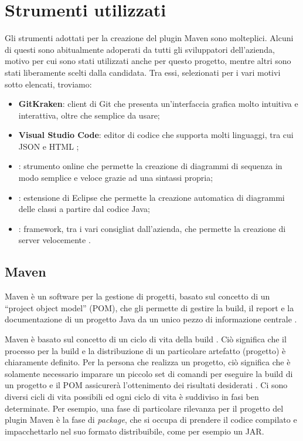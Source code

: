 
\section{Strumenti utilizzati}
Gli strumenti adottati per la creazione del plugin Maven sono molteplici.
Alcuni di questi sono abitualmente adoperati da tutti gli sviluppatori dell'azienda, motivo per cui sono stati utilizzati anche per questo progetto, mentre altri sono stati liberamente scelti dalla candidata.
Tra essi, selezionati per i vari motivi sotto elencati, troviamo:
\begin{itemize}
    \item \textbf{GitKraken}: client di Git che presenta un'interfaccia grafica molto intuitiva e interattiva, oltre che semplice da usare;
    \item \textbf{Visual Studio Code}: editor di codice che supporta molti linguaggi, tra cui JSON e HTML \cite{site:visual-studio-code};
    \item {}: strumento online che permette la creazione di diagrammi di sequenza in modo semplice e veloce grazie ad una sintassi propria;
    \item {}: estensione di Eclipse che permette la creazione automatica di diagrammi delle classi a partire dal codice Java;
    \item {}: framework, tra i vari consigliat dall'azienda, che permette la creazione di server velocemente \cite{site:meecrowave}.
\end{itemize}

    \subsection{Maven} \label{mavenSection} %
        
    Maven è un software per la gestione di progetti, basato sul concetto di un ``project object model'' (POM), che gli permette di gestire la build, il report e la documentazione di un progetto Java da un unico pezzo di informazione centrale \cite{site:maven-introduzione}.

    Maven è basato sul concetto di un ciclo di vita della build .
    Ciò significa che il processo per la build e la distribuzione di un particolare artefatto (progetto) è chiaramente definito. 
    Per la persona che realizza un progetto, ciò significa che è solamente necessario imparare un piccolo set di comandi per eseguire la build di un progetto e il POM assicurerà l'ottenimento dei risultati desiderati \cite{site:maven-lifecycle}.
    Ci sono diversi cicli di vita possibili ed ogni ciclo di vita è suddiviso in fasi ben determinate.
    Per esempio, una fase di particolare rilevanza per il progetto del plugin Maven è la fase di \emph{package}, che si occupa di prendere il codice compilato e impacchettarlo nel suo formato distribuibile, come per esempio un JAR. 

